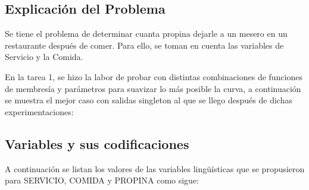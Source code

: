 \documentclass[11pt, letterpaper]{article}
\begin{document}
\subsection{Explicación del Problema}

Se tiene el problema de determinar cuanta propina dejarle a un mesero en un restaurante después de comer. Para ello, se toman en cuenta las variables de Servicio y la Comida.

En la tarea 1, se hizo la labor de probar con distintas combinaciones de funciones de membresía y parámetros para suavizar lo más posible la curva, a continuación se muestra el mejor caso con salidas singleton al que se llego después de dichas experimentaciones:

\subsection{Variables y sus codificaciones}

A continuación se listan los valores de las variables lingüísticas que se
propusieron para SERVICIO, COMIDA y PROPINA como sigue:
\end{document}
